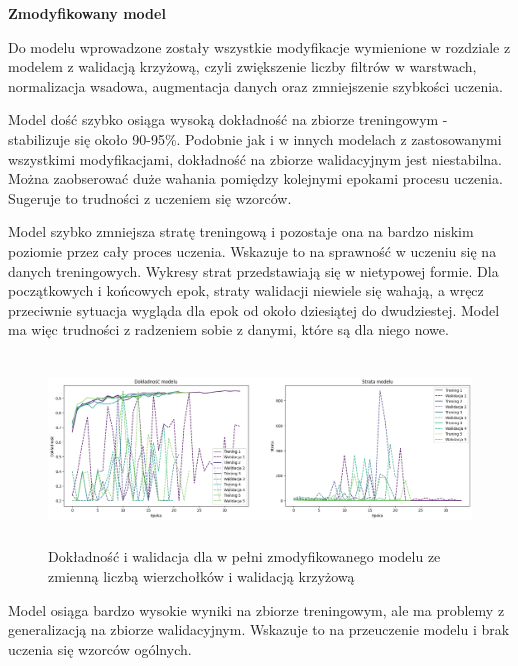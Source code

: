 \textbf{Zmodyfikowany model}

Do modelu wprowadzone zostały wszystkie modyfikacje wymienione w rozdziale z modelem z walidacją krzyżową,
czyli zwiększenie liczby filtrów w warstwach, normalizacja wsadowa, augmentacja danych oraz zmniejszenie szybkości uczenia.

Model dość szybko osiąga wysoką dokładność na zbiorze treningowym - stabilizuje się około 90-95\%.
Podobnie jak i w innych modelach z zastosowanymi wszystkimi modyfikacjami,
dokładność na zbiorze walidacyjnym jest niestabilna.
Można zaobserować duże wahania pomiędzy kolejnymi epokami procesu uczenia.
Sugeruje to trudności z uczeniem się wzorców.

Model szybko zmniejsza stratę treningową i pozostaje ona na bardzo niskim poziomie przez cały proces uczenia.
Wskazuje to na sprawność w uczeniu się na danych treningowych.
Wykresy strat przedstawiają się w nietypowej formie.
Dla początkowych i końcowych epok, straty walidacji niewiele się wahają,
a wręcz przeciwnie sytuacja wygląda dla epok od około dziesiątej do dwudziestej.
Model ma więc trudności z radzeniem sobie z danymi, które są dla niego nowe.

\begin{figure}[ht]
	\centering
	\includegraphics[height=5cm]{resources/tests/images/v4/multiple_edges_crossvalid_img.png}
	\caption{Dokładność i walidacja dla w pełni zmodyfikowanego modelu ze zmienną liczbą wierzchołków i walidacją krzyżową}
	\label{Fig:tests-csvar-2a}
\end{figure}
\FloatBarrier

Model osiąga bardzo wysokie wyniki na zbiorze treningowym,
ale ma problemy z generalizacją na zbiorze walidacyjnym.
Wskazuje to na przeuczenie modelu i brak uczenia się wzorców ogólnych.

